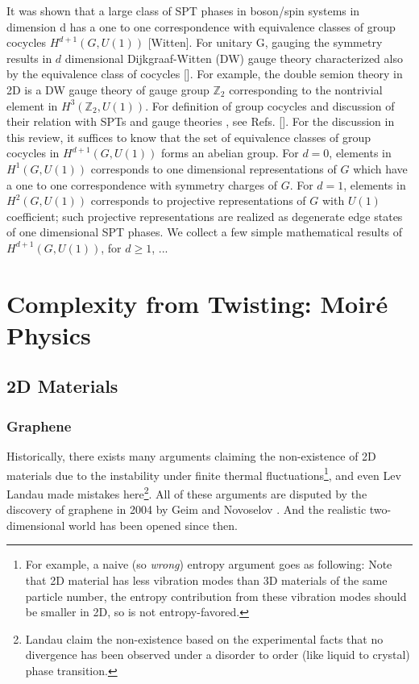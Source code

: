 It was shown that a large class of SPT phases in boson/spin systems in dimension d has a one to one correspondence with equivalence classes of group cocycles $H^{d+1}(G, U (1))$ [Witten]. For unitary G, gauging the symmetry results in $d$ dimensional Dijkgraaf-Witten (DW) gauge theory characterized also by the equivalence class of cocycles []. For example, the double semion theory in 2D is a DW gauge theory of gauge group $\mathbb Z_2$ corresponding to the nontrivial element in $H^3 (\mathbb Z_2 , U(1))$. For definition of group cocycles and discussion of their relation with SPTs and gauge theories , see Refs. [].
For the discussion in this review, it suffices to know that the set of equivalence classes of group cocycles in $H^{d+1}(G, U (1))$ forms an abelian group. For $d=0$, elements in $H^1(G, U(1))$ corresponds to one dimensional representations of $G$ which have a one to one correspondence with symmetry charges of $G$. For $d=1$, elements in $H^2(G, U(1))$ corresponds to projective representations of $G$ with $U(1)$ coefficient; such projective representations are realized as degenerate edge states of one dimensional SPT phases. We collect a few simple mathematical results of $H^{d+1}(G, U (1))$, for $d\geq1$, ...


\section{Complexity from Twisting: Moir\'{e} Physics}
\subsection{2D Materials}
\subsubsection{Graphene}
Historically, there exists many arguments claiming the non-existence of 2D materials due to the instability under finite thermal fluctuations\footnote{For example, a naive (so \emph{wrong}) entropy argument goes as following: Note that 2D material has less vibration modes than 3D materials of the same particle number, the entropy contribution from these vibration modes should be smaller in 2D, so is not entropy-favored.}, and even Lev Landau made mistakes here\footnote{Landau claim the non-existence based on the experimental facts that no divergence has been observed under a disorder to order (like liquid to crystal) phase transition.}. All of these arguments are disputed by the discovery of graphene in 2004 by Geim and Novoselov \cite{novoselov2004electric}. And the realistic two-dimensional world has been opened since then.

